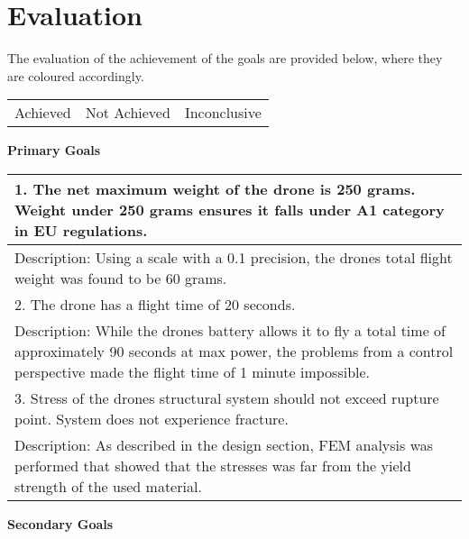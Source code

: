 \setlength{\parskip}{0pt}
\section{Evaluation}
The evaluation of the achievement of the goals are provided below, 
where they are coloured accordingly.

\begin{center}

  \bigbreak

  \begin{tabular}{ c|c|c } 
      \color{ForestGreen}{Green} & \color{BrickRed}{Red} & \color{YellowOrange}{Orange} \\ 
      \hline
      Achieved & Not Achieved & Inconclusive \\  
  \end{tabular}

  \bigbreak
  \bigbreak
  \bigbreak
  \textbf{Primary Goals} 
  \bigbreak

  \begin{tabular}{| m{33em} |}
      \hline
      \color{ForestGreen}
      1. The net maximum weight of the drone is 250 grams. 
      Weight under 250 grams ensures it falls under A1 
      category in EU regulations. \\ 
      \hline
      Description:  Using a scale with a 0.1 precision, the drones total flight weight was found to be 60 grams.  \\ 
      \hline
      \hline
      \color{YellowOrange}
      2. The drone has a flight time of 20 seconds. \\ 
      \hline
      Description:  While the drones battery allows it to fly a total time of approximately 90 seconds at max power, the problems from a control perspective made 		      the flight time of 1 minute impossible.    \\ 
      \hline
      \hline
      \color{ForestGreen}
      3. Stress of the drones structural system should 
      not exceed rupture point. System does not experience 
      fracture. \\
      \hline
      Description:  As described in the design section, FEM analysis was performed that showed that the stresses was far from the yield strength of the used material. \\ 
      \hline
  \end{tabular}

  \bigbreak
  \textbf{Secondary Goals} 
  \bigbreak


\end{center}
